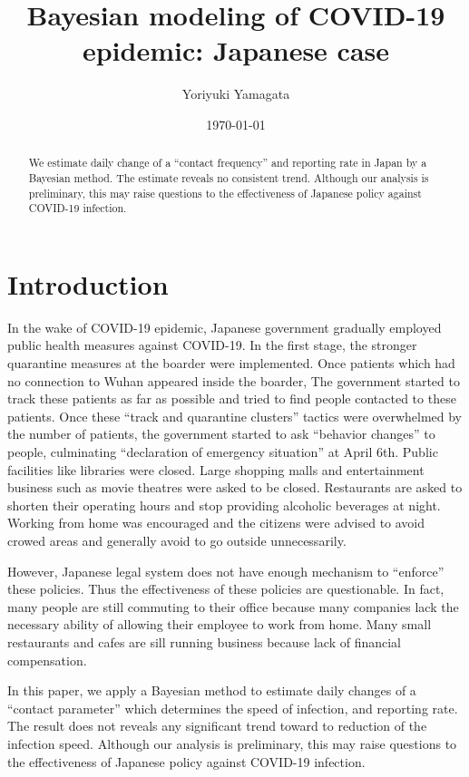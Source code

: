 \documentclass{article}
\title{Bayesian modeling of COVID-19 epidemic: Japanese case}
\author{Yoriyuki Yamagata}
\date{\today}
\begin{document}
\maketitle

\begin{abstract}
    We estimate daily change of a ``contact frequency'' and reporting rate in Japan by a Bayesian method.
    The estimate reveals no consistent trend.
    Although our analysis is preliminary, this may raise questions to the effectiveness of Japanese policy against COVID-19 infection.
\end{abstract}

\section{Introduction}

In the wake of COVID-19 epidemic, Japanese government gradually  employed public health measures against COVID-19.
In the first stage, the stronger quarantine measures at the boarder were implemented.
Once patients which had no connection to Wuhan appeared inside the boarder, The government started to track these patients as far as possible and tried to find people contacted to these patients.
Once these ``track and quarantine clusters'' tactics were overwhelmed by the number of patients, the government started to ask ``behavior changes'' to people, culminating ``declaration of emergency situation'' at April 6th.
Public facilities like libraries were closed.
Large shopping malls and entertainment business such as movie theatres were asked to be closed.
Restaurants are asked to shorten their operating hours and stop providing alcoholic beverages at night.
Working from home was encouraged and the citizens were advised to avoid crowed areas and generally avoid to go outside unnecessarily.

However, Japanese legal system does not have enough mechanism to ``enforce'' these policies.
Thus the effectiveness of these policies are questionable.
In fact, many people are still commuting to their office because many companies lack the necessary ability of allowing their employee to work from home.
Many small restaurants and cafes are sill running business because lack of financial compensation.

In this paper, we apply a Bayesian method to estimate daily changes of a ``contact parameter'' which determines the speed of infection, and reporting rate.
The result does not reveals any significant trend toward to reduction of the infection speed.
Although our analysis is preliminary, this may raise questions to the effectiveness of Japanese policy against COVID-19 infection.
\end{document}
